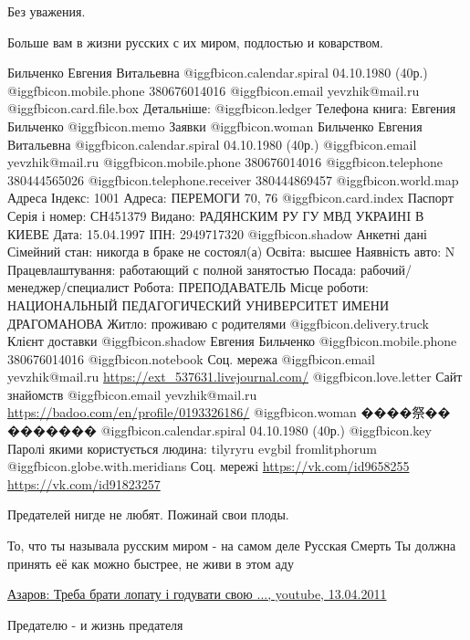 \begin{itemize}
Без уважения.

Больше вам в жизни русских с их миром, подлостью и коварством.


\obeycr
Бильченко Евгения Витальевна
@igg{fbicon.calendar.spiral}  04.10.1980 (40р.)
 @igg{fbicon.mobile.phone}  380676014016
 @igg{fbicon.email}  yevzhik@mail.ru
 @igg{fbicon.card.file.box}  Детальніше:
 @igg{fbicon.ledger}  Телефона книга:
Евгения Бильченко
 @igg{fbicon.memo}  Заявки
 @igg{fbicon.woman}  Бильченко Евгения Витальевна
 @igg{fbicon.calendar.spiral}  04.10.1980 (40р.)
 @igg{fbicon.email}  yevzhik@mail.ru
 @igg{fbicon.mobile.phone}  380676014016
@igg{fbicon.telephone} 380444565026
 @igg{fbicon.telephone.receiver}  380444869457
 @igg{fbicon.world.map}  Адреса
Індекс: 1001
Адреса: ПЕРЕМОГИ 70, 76
 @igg{fbicon.card.index}  Паспорт
Серія і номер: СН451379
Видано: РАДЯНСКИМ РУ ГУ МВД УКРАИНI В КИЕВЕ
Дата: 15.04.1997
ІПН: 2949717320
 @igg{fbicon.shadow}  Анкетні дані
Сімейний стан: никогда в браке не состоял(а)
Освіта: высшее
Наявність авто: N
Працевлаштування: работающий с полной занятостью
Посада: рабочий/менеджер/специалист
Робота: ПРЕПОДАВАТЕЛЬ
Місце роботи: НАЦИОНАЛЬНЫЙ ПЕДАГОГИЧЕСКИЙ УНИВЕРСИТЕТ ИМЕНИ ДРАГОМАНОВА
Житло: проживаю с родителями
 @igg{fbicon.delivery.truck}  Клієнт доставки
 @igg{fbicon.shadow}  Евгения Бильченко
 @igg{fbicon.mobile.phone}  380676014016
 @igg{fbicon.notebook}  Соц. мережа
 @igg{fbicon.email}  yevzhik@mail.ru
\url{https://ext_537631.livejournal.com/}
 @igg{fbicon.love.letter}  Сайт знайомств
 @igg{fbicon.email}  yevzhik@mail.ru
\url{https://badoo.com/en/profile/0193326186/}
 @igg{fbicon.woman}  ����祭�� �������
 @igg{fbicon.calendar.spiral}  04.10.1980 (40р.)
 @igg{fbicon.key}  Паролі якими користується людина:
tilyryru
evgbil
fromlitphorum
 @igg{fbicon.globe.with.meridians}  Соц. мережі
\url{https://vk.com/id9658255}
\url{https://vk.com/id91823257}
\restorecr

Предателей нигде не любят. Пожинай свои плоды.

То, что ты называла русским миром - на самом деле Русская Смерть
Ты должна принять её как можно быстрее, не живи в этом аду


\href{https://www.youtube.com/watch?v=S9X86A582AQ}{%
Азаров: Треба брати лопату і годувати свою ..., youtube, 13.04.2011%
}


Предателю - и жизнь предателя


\end{itemize}
